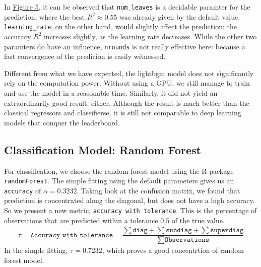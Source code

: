 \documentclass[8pt]{article}
\begin{document}
In \hyperref[fig:lambda]{Figure 5}, it can be observed that \texttt{num\_leaves} is a decidable 
paramter for the prediction, where the best $R^2 \approx 0.55$ was already given by the default value.
\texttt{learning\_rate}, on the other hand, would slightly affect the prediction: 
the accuracy $R^2$ increases slightly, as the learning rate decreases. While the other two 
paramters do have an influence, \texttt{nrounds} is not really effective here:
because a fast convergence of the predicion is easily witnessed.  

Different from what we have expected, the lightbgm model does not significantly rely on the computation power. 
Without using a GPU, we still manage to train and use the model in a reasonable time. 
Similarly, it did not yield an extraordinarily good result, either. Although the result is much better
than the classical regressors and classifierse, it is still not comparable to deep learning models 
that conquer the leaderboard.

\subsection{Classification Model: Random Forest}
For classification, we choose the random forest model using the R package \texttt{randomForest}.
The simple fitting using the default parameters gives us an \texttt{accuracy} of $\alpha = 0.3232$. 
Taking look at the confusion matrix, we found that prediction is concentrated along the diagonal, 
but does not have a high accuracy. So we present a new metric, \texttt{accuracy with tolerance}. 
This is the percentage of observations that are predicted within a tolerance $0.5$ of the true value.
\begin{align*}
    \tau = \texttt{Accuracy with tolerance} = \dfrac{\sum \texttt{diag} + \sum \texttt{subdiag} + \sum \texttt{superdiag}}{\sum \texttt{Observations}}
\end{align*}
In the simple fitting, $\tau = 0.7232$, which proves a good concentrtion of random forest model. 
\end{document}
